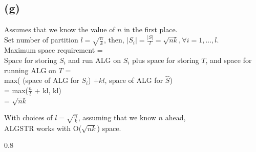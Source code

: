 \documentclass{article}
\newenvironment{myenv}[1]
  {\begin{spacing}{#1}}
  {\end{spacing}}
\begin{document}
\subsection{(g)}
Assumes that we know the value of $n$ in the first place. \\
Set number of partition $l = \sqrt{\frac{n}{k}}$, then, $|S_i| = \frac{|S|}{l} = \sqrt{nk}, \forall i=1,...,l$. \\
Maximum space requirement = \\ Space for storing $S_i$ and run ALG on $S_i$ plus space for storing $T$, and space for running ALG on $T$ =\\
 max( (space of ALG for $S_i$) $+ kl$, space of ALG for $\hat S$) \\
= max($\frac{n}{l}$ + kl, kl) \\
= $\sqrt{nk}$

With choices of $l = \sqrt{\frac{n}{k}}$, assuming that we know $n$ ahead, \\
ALGSTR works with O($\sqrt{nk}$) space.



\begin{myenv}{0.8}
\begin{verbatim}
\end{verbatim}
\end{myenv}
\end{document}
